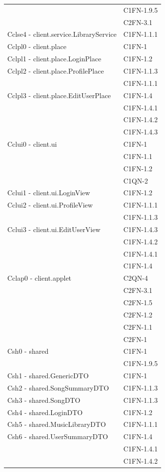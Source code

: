 \begin{footnotesize}
\begin{longtable}[!h]{|l|l|}
& C1FN-1.9.5 \\
& C2FN-3.1 \\\hline
Cclse4 - client.service.LibraryService & C1FN-1.1.1 \\\hline
Cclpl0 - client.place & C1FN-1 \\\hline
Cclpl1 - client.place.LoginPlace & C1FN-1.2 \\\hline
Cclpl2 - client.place.ProfilePlace & C1FN-1.1.3 \\
& C1FN-1.1.1 \\\hline
Cclpl3 - client.place.EditUserPlace & C1FN-1.4 \\
& C1FN-1.4.1 \\
& C1FN-1.4.2 \\
& C1FN-1.4.3 \\\hline
Cclui0 - client.ui & C1FN-1 \\
& C1FN-1.1 \\
& C1FN-1.2 \\
& C1QN-2 \\\hline
Cclui1 - client.ui.LoginView & C1FN-1.2 \\ \hline
Cclui2 - client.ui.ProfileView & C1FN-1.1.1 \\
& C1FN-1.1.3 \\\hline
Cclui3 - client.ui.EditUserView & C1FN-1.4.3 \\
& C1FN-1.4.2 \\
& C1FN-1.4.1 \\
& C1FN-1.4 \\\hline
Cclap0 - client.applet & C2QN-4 \\
& C2FN-3.1 \\
& C2FN-1.5 \\
& C2FN-1.2 \\
& C2FN-1.1 \\
& C2FN-1 \\\hline
Csh0 - shared & C1FN-1 \\
& C1FN-1.9.5 \\\hline
Csh1 - shared.GenericDTO & C1FN-1 \\\hline
Csh2 - shared.SongSummaryDTO & C1FN-1.1.3 \\\hline
Csh3 - shared.SongDTO & C1FN-1.1.3 \\\hline
Csh4 - shared.LoginDTO & C1FN-1.2 \\\hline
Csh5 - shared.MusicLibraryDTO & C1FN-1.1.1 \\\hline
Csh6 - shared.UserSummaryDTO & C1FN-1.4 \\
& C1FN-1.4.1 \\
& C1FN-1.4.2 \\

\end{longtable}
\end{footnotesize}
